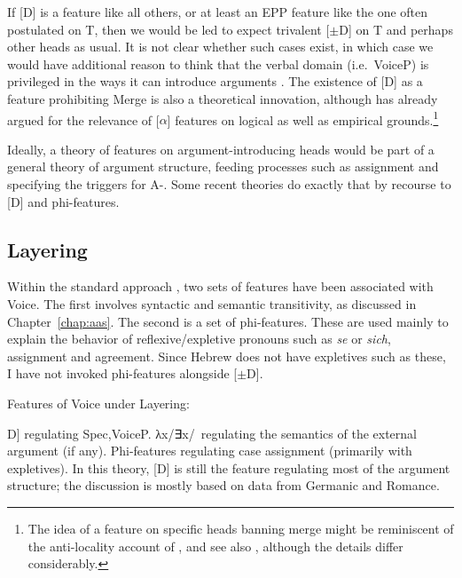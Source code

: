 \begin{exe}
\begin{xlist}
\begin{xlist}
\begin{xlist}
\begin{xlist}
\begin{xlist}
\begin{xlist}
\begin{exe}
\begin{xlist}
\begin{exe}
\begin{exe}
\begin{xlist}
\begin{exe}
\begin{exe}
\begin{xlist}
\begin{exe}
\begin{xlist}
\begin{exe}
\begin{xlist}
\begin{exe}
\begin{xlist}
\begin{exe}
\begin{xlist}
\label{r1:g:2c1}If [D] is a feature like all others, or at least an EPP feature like the one often postulated on T, then we would be led to expect trivalent [$\pm$D] on T and perhaps other heads as usual. It is not clear whether such cases exist, in which case we would have additional reason to think that the verbal domain (i.e.~VoiceP) is privileged in the ways it can introduce arguments \citep{grimshaw00,woodmarantz17}. The existence of [\textminus{}D] as a feature prohibiting Merge is also a theoretical innovation, although \cite{harbour11,harbour14} has already argued for the relevance of [\textminus{}$\alpha$] features on logical as well as empirical grounds.\footnote{The idea of a feature on specific heads banning merge might be reminiscent of the anti-locality account of \cite{grohmann03}, and see also \cite{baier18phd}, although the details differ considerably.}

Ideally, a theory of features on argument-introducing heads would be part of a general theory of argument structure, feeding processes such as  assignment and specifying the triggers for A-. Some recent theories do exactly that by recourse to [D] and phi-features.

	\subsection{Layering}\largerpage[-1]
Within the standard  approach \citep{schaefer08,schaefer12,schaefer17oup}, two sets of features have been associated with Voice. The first involves syntactic and semantic transitivity, as discussed in Chapter~\ref{chap:aas}. The second is a set of phi-features. These are used mainly to explain the behavior of reflexive/expletive pronouns such as  \emph{se} or  \emph{sich},  assignment and agreement. Since Hebrew does not have expletives such as these, I have not invoked phi-features alongside [$\pm$D].

 \begin{exe}
 \ex  Features of Voice under Layering: 
 \begin{xlist} 
 	\ex  {[}D] regulating Spec,VoiceP. 
 	\ex  λx/∃x/\zero~regulating the semantics of the external argument (if any). 
 	\ex  Phi-features regulating case assignment (primarily with expletives). 
 \z
\z 
In this theory, [D] is still the feature regulating most of the argument structure; the discussion is mostly based on data from Germanic and Romance.


\end{xlist}
\end{exe}
\end{xlist}
\end{exe}
\end{xlist}
\end{exe}
\end{xlist}
\end{exe}
\end{xlist}
\end{exe}
\end{xlist}
\end{exe}
\end{exe}
\end{xlist}
\end{exe}
\end{exe}
\end{xlist}
\end{exe}
\end{xlist}
\end{xlist}
\end{xlist}
\end{xlist}
\end{xlist}
\end{xlist}
\end{exe}

